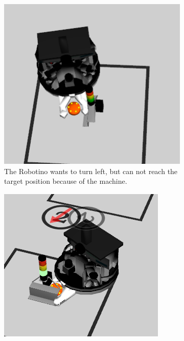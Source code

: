 \begin{figure}
  \centering
  \begin{subfigure}[b]{0.40\textwidth}
    \includegraphics[width=\textwidth]{pics/bad_performance_eindhoven_no_reset}
    \caption{The Robotino wants to turn left, but can not reach the target position because of the machine.}
    \label{fig:fails_stuck}
  \end{subfigure}
  \begin{subfigure}[b]{0.40\textwidth}
    \includegraphics[width=\textwidth]{pics/wrong_local_bad_angle}

\end{subfigure}
\end{figure}
